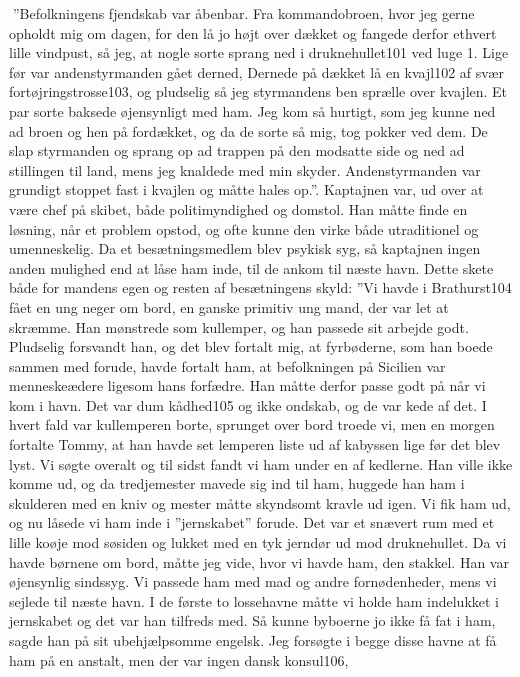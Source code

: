 ''Befolkningens fjendskab var åbenbar. Fra kommandobroen, hvor jeg
gerne opholdt mig om dagen, for den lå jo højt over dækket og fangede
derfor ethvert lille vindpust, så jeg, at nogle sorte sprang ned i
druknehullet101 ved luge 1. Lige før var andenstyrmanden gået derned,
Dernede på dækket lå en kvajl102 af svær fortøjringstrosse103, og
pludselig så jeg styrmandens ben sprælle over kvajlen. Et par sorte
baksede øjensynligt med ham. Jeg kom så hurtigt, som jeg kunne ned ad
broen og hen på fordækket, og da de sorte så mig, tog pokker ved dem. De
slap styrmanden og sprang op ad trappen på den modsatte side og ned ad
stillingen til land, mens jeg knaldede med min skyder. Andenstyrmanden
var grundigt stoppet fast i kvajlen og måtte hales op.''. Kaptajnen var,
ud over at være chef på skibet, både politimyndighed og domstol. Han
måtte finde en løsning, når et problem opstod, og ofte kunne den virke
både utraditionel og umenneskelig. Da et besætningsmedlem blev psykisk
syg, så kaptajnen ingen anden mulighed end at låse ham inde, til de
ankom til næste havn. Dette skete både for mandens egen og resten af
besætningens skyld: ''Vi havde i Brathurst104 fået en ung neger om bord,
en ganske primitiv ung mand, der var let at skræmme. Han mønstrede som
kullemper, og han passede sit arbejde godt. Pludselig forsvandt han, og
det blev fortalt mig, at fyrbøderne, som han boede sammen med forude,
havde fortalt ham, at befolkningen på Sicilien var menneskeædere ligesom
hans forfædre. Han måtte derfor passe godt på når vi kom i havn. Det var
dum kådhed105 og ikke ondskab, og de var kede af det. I hvert fald var
kullemperen borte, sprunget over bord troede vi, men en morgen fortalte
Tommy, at han havde set lemperen liste ud af kabyssen lige før det blev
lyst. Vi søgte overalt og til sidst fandt vi ham under en af kedlerne.
Han ville ikke komme ud, og da tredjemester mavede sig ind til ham,
huggede han ham i skulderen med en kniv og mester måtte skyndsomt kravle
ud igen. Vi fik ham ud, og nu låsede vi ham inde i ''jernskabet''
forude. Det var et snævert rum med et lille koøje mod søsiden og lukket
med en tyk jerndør ud mod druknehullet. Da vi havde børnene om bord,
måtte jeg vide, hvor vi havde ham, den stakkel. Han var øjensynlig
sindssyg. Vi passede ham med mad og andre fornødenheder, mens vi sejlede
til næste havn. I de første to lossehavne måtte vi holde ham indelukket
i jernskabet og det var han tilfreds med. Så kunne byboerne jo ikke få
fat i ham, sagde han på sit ubehjælpsomme engelsk. Jeg forsøgte i begge
disse havne at få ham på en anstalt, men der var ingen dansk konsul106,
